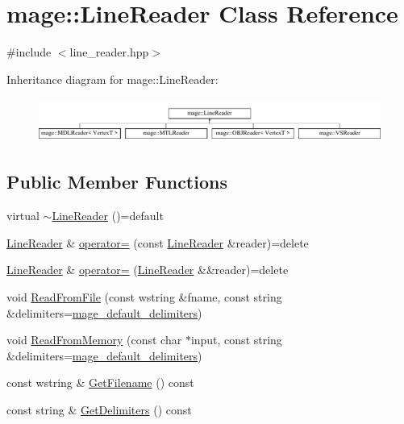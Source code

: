 \hypertarget{classmage_1_1_line_reader}{}\section{mage\+:\+:Line\+Reader Class Reference}
\label{classmage_1_1_line_reader}


{\ttfamily \#include $<$line\+\_\+reader.\+hpp$>$}

Inheritance diagram for mage\+:\+:Line\+Reader\+:\begin{figure}[H]
\begin{center}
\leavevmode
\includegraphics[height=1.458333cm]{classmage_1_1_line_reader}
\end{center}
\end{figure}
\subsection*{Public Member Functions}
\begin{DoxyCompactItemize}
\item 
virtual \hyperlink{classmage_1_1_line_reader_aa058c338d8256d7f7b775bf4f7052508}{$\sim$\+Line\+Reader} ()=default
\item 
\hyperlink{classmage_1_1_line_reader}{Line\+Reader} \& \hyperlink{classmage_1_1_line_reader_a2247078d0b5602f9a9a6b74019832faf}{operator=} (const \hyperlink{classmage_1_1_line_reader}{Line\+Reader} \&reader)=delete
\item 
\hyperlink{classmage_1_1_line_reader}{Line\+Reader} \& \hyperlink{classmage_1_1_line_reader_a45504c0ba4238eedf851cfb9df081a01}{operator=} (\hyperlink{classmage_1_1_line_reader}{Line\+Reader} \&\&reader)=delete
\item 
void \hyperlink{classmage_1_1_line_reader_a2df875468f06ec58c7aa1ff96157aeb0}{Read\+From\+File} (const wstring \&fname, const string \&delimiters=\hyperlink{namespacemage_ae247ad66af37a4b0d67ddca9404ca01a}{mage\+\_\+default\+\_\+delimiters})
\item 
void \hyperlink{classmage_1_1_line_reader_a1c21aba81c3873c7ed299ca978c4db74}{Read\+From\+Memory} (const char $\ast$input, const string \&delimiters=\hyperlink{namespacemage_ae247ad66af37a4b0d67ddca9404ca01a}{mage\+\_\+default\+\_\+delimiters})
\item 
const wstring \& \hyperlink{classmage_1_1_line_reader_a64a800d9fe9c242b9b14d034a7d604eb}{Get\+Filename} () const
\item 
const string \& \hyperlink{classmage_1_1_line_reader_a7de405beff27d5cc55bb93e1b1e9727a}{Get\+Delimiters} () const
\end{DoxyCompactItemize}
